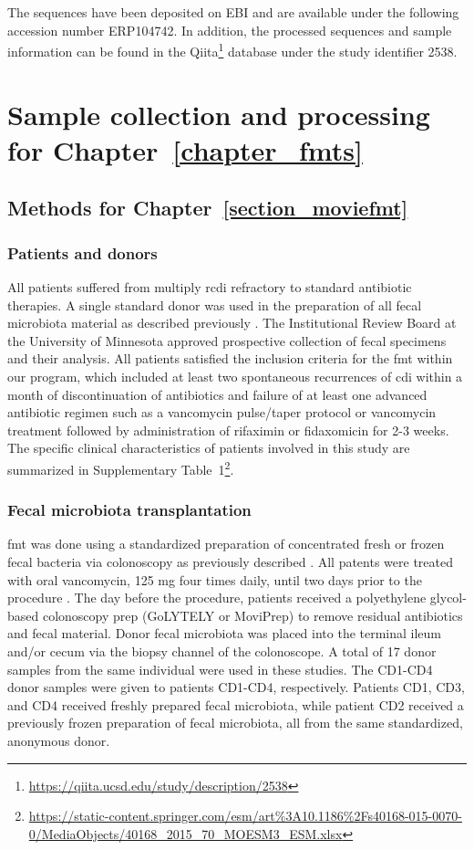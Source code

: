 The sequences have been deposited on EBI and are available under the following
accession number ERP104742.  In addition, the processed sequences and sample
information can be found in the
Qiita\footnote{\url{https://qiita.ucsd.edu/study/description/2538}} database
under the study identifier 2538.

\chapter{Sample collection and processing for 
Chapter~\ref{chapter_fmts}}\label{appendix_fmts}

\section{Methods for Chapter~\ref{section_moviefmt}}\label{appendix_moviefmt}

\subsection{Patients and donors}
All patients suffered from multiply \gls{rcdi} refractory to standard 
antibiotic therapies. A single standard donor was used in the preparation of 
all fecal microbiota material as described previously \cite{RN45}. The 
Institutional Review Board at the University of Minnesota approved prospective 
collection of fecal specimens and their analysis. All patients satisfied the 
inclusion criteria for the \gls{fmt} within our program, which included at 
least two spontaneous recurrences of \gls{cdi} within a month of 
discontinuation of antibiotics and failure of at least one advanced antibiotic 
regimen such as a vancomycin pulse/taper protocol or vancomycin treatment 
followed by administration of rifaximin or fidaxomicin for 2-3 weeks.  The 
specific clinical characteristics of patients involved in this study are 
summarized in Supplementary 
Table~1\footnote{\url{https://static-content.springer.com/esm/art\%3A10.1186\%2Fs40168-015-0070-0/MediaObjects/40168_2015_70_MOESM3_ESM.xlsx}}.  

\subsection{Fecal microbiota transplantation}
\Gls{fmt} was done using a standardized preparation of concentrated fresh or 
frozen fecal bacteria via colonoscopy as previously described \cite{RN45}. All 
patents were treated with oral vancomycin, 125 mg four times daily, until two 
days prior to the procedure \cite{RN45}. The day before the procedure, patients 
received a polyethylene glycol-based colonoscopy prep 
(GoLYTELY\textsuperscript{\textregistered} or 
MoviPrep\textsuperscript{\textregistered}) to remove residual antibiotics and 
fecal material. Donor fecal microbiota was placed into the terminal ileum 
and/or cecum via the biopsy channel of the colonoscope. A total of 17 donor 
samples from the same individual were used in these studies.  The CD1-CD4 donor 
samples were given to patients CD1-CD4, respectively. Patients CD1, CD3, and 
CD4 received freshly prepared fecal microbiota, while patient CD2 received a 
previously frozen preparation of fecal microbiota, all from the same 
standardized, anonymous donor.

